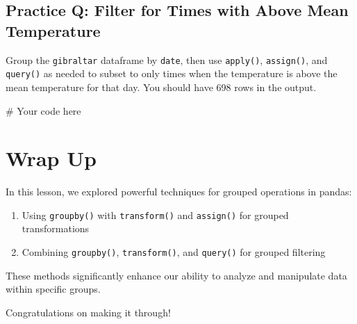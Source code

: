 \documentclass[
  letterpaper,
  DIV=11,
  numbers=noendperiod]{scrreprt}
\newenvironment{Shaded}{\begin{snugshade}}{\end{snugshade}}
\newcommand{\CommentTok}[1]{\textcolor[rgb]{0.37,0.37,0.37}{#1}}
\providecommand{\tightlist}{%
  \setlength{\itemsep}{0pt}\setlength{\parskip}{0pt}}\usepackage{longtable,booktabs,array}
\begin{document}
\begin{tcolorbox}[enhanced jigsaw, colframe=quarto-callout-tip-color-frame, opacityback=0, titlerule=0mm, bottomrule=.15mm, breakable, leftrule=.75mm, colbacktitle=quarto-callout-tip-color!10!white, title=\textcolor{quarto-callout-tip-color}{\faLightbulb}\hspace{0.5em}{Practice}, rightrule=.15mm, coltitle=black, opacitybacktitle=0.6, colback=white, left=2mm, arc=.35mm, toptitle=1mm, bottomtitle=1mm, toprule=.15mm]

\subsection{Practice Q: Filter for Times with Above Mean
Temperature}\label{practice-q-filter-for-times-with-above-mean-temperature}

Group the \texttt{gibraltar} dataframe by \texttt{date}, then use
\texttt{apply()}, \texttt{assign()}, and \texttt{query()} as needed to
subset to only times when the temperature is above the mean temperature
for that day. You should have 698 rows in the output.

\begin{Shaded}
\begin{Highlighting}[]
\CommentTok{\# Your code here}
\end{Highlighting}
\end{Shaded}

\end{tcolorbox}

\section{Wrap Up}\label{wrap-up-9}

In this lesson, we explored powerful techniques for grouped operations
in pandas:

\begin{enumerate}
\def\labelenumi{\arabic{enumi}.}
\tightlist
\item
  Using \texttt{groupby()} with \texttt{transform()} and
  \texttt{assign()} for grouped transformations
\item
  Combining \texttt{groupby()}, \texttt{transform()}, and
  \texttt{query()} for grouped filtering
\end{enumerate}

These methods significantly enhance our ability to analyze and
manipulate data within specific groups.

Congratulations on making it through!
\end{document}

